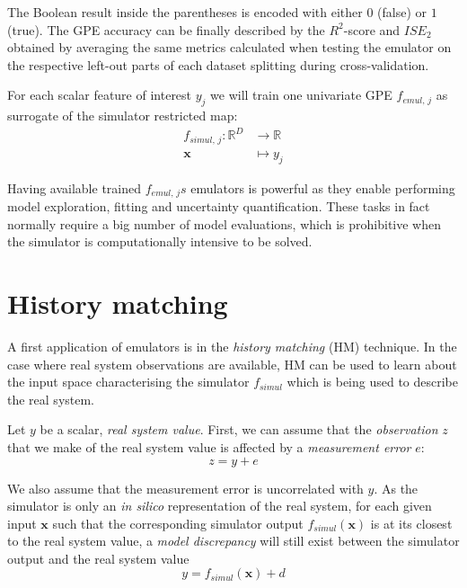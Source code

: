 \noindent
The Boolean result inside the parentheses is encoded with either $0$ (false) or $1$ (true). The GPE accuracy can be finally described by the $R^2$-score and $ISE_2$ obtained by averaging the same metrics calculated when testing the emulator on the respective left-out parts of each dataset splitting during cross-validation.

\vspace{0.2cm}
For each scalar feature of interest $y_j$ we will train one univariate GPE $f_{emul,\,j}$ as surrogate of the simulator restricted map:
%
\begin{align}\label{eq:univariatesimulator}
    f_{simul,\,j}\colon\mathbb{R}^{D} &\to \mathbb{R} \\
    \mathbf{x} &\mapsto y_j \nonumber
\end{align}

\noindent
Having available trained $f_{emul,\,j}s$ emulators is powerful as they enable performing model exploration, fitting and uncertainty quantification. These tasks in fact normally require a big number of model evaluations, which is prohibitive when the simulator is computationally intensive to be solved.


%
%
%
\section{History matching}\label{sec:ch3historymatching}
A first application of emulators is in the \textit{history matching} (\acs{HM}) technique. In the case where real system observations are available, HM can be used to learn about the input space characterising the simulator $f_{simul}$ which is being used to describe the real system.

\vspace{0.2cm}
Let $y$ be a scalar, \textit{real system value}. First, we can assume that the \textit{observation} $z$ that we make of the real system value is affected by a \textit{measurement error} $e$:
%
\begin{equation}
z = y + e
\end{equation}

\noindent
We also assume that the measurement error is uncorrelated with $y$. As the simulator is only an \textit{in silico} representation of the real system, for each given input $\mathbf{x}$ such that the corresponding simulator output $f_{simul}(\mathbf{x})$ is at its closest to the real system value, a \textit{model discrepancy} will still exist between the simulator output and the real system value
%
\begin{equation}
y = f_{simul}(\mathbf{x}) + d
\end{equation}

